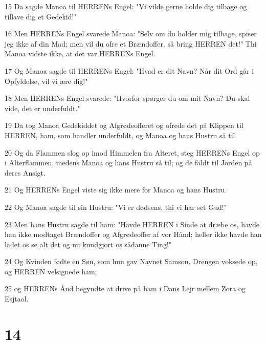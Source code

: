 \par 15 Da sagde Manoa til HERRENs Engel: "Vi vilde gerne holde dig tilbage og tillave dig et Gedekid!"
\par 16 Men HERRENs Engel svarede Manoa: "Selv om du holder mig tilbage, spiser jeg ikke af din Mad; men vil du ofre et Brændoffer, så bring HERREN det!" Thi Manoa vidste ikke, at det var HERRENs Engel.
\par 17 Og Manoa sagde til HERRENs Engel: "Hvad er dit Navn? Når dit Ord går i Opfyldelse, vil vi ære dig!"
\par 18 Men HERRENs Engel svarede: "Hvorfor spørger du om mit Navn? Du skal vide, det er underfuldt."
\par 19 Da tog Manoa Gedekiddet og Afgrødeofferet og ofrede det på Klippen til HERREN, ham, som handler underfuldt, og Manoa og hans Hustru så til.
\par 20 Og da Flammen slog op imod Himmelen fra Alteret, steg HERRENs Engel op i Alterflammen, medens Manoa og hans Hustru så til; og de faldt til Jorden på deres Ansigt.
\par 21 Og HERRENs Engel viste sig ikke mere for Manoa og hans Hustru.
\par 22 Og Manoa sagde til sin Hustru: "Vi er dødsens, thi vi har set Gud!"
\par 23 Men hans Hustru sagde til ham: "Havde HERREN i Sinde at dræbe os, havde han ikke modtaget Brændoffer og Afgrødeoffer af vor Hånd; heller ikke havde han ladet os se alt det og nu kundgjort os sådanne Ting!"
\par 24 Og Kvinden fødte en Søn, som hun gav Navnet Samson. Drengen voksede op, og HERREN velsignede ham;
\par 25 og HERRENs Ånd begyndte at drive på ham i Dans Lejr mellem Zora og Esjtaol.

\chapter{14}

